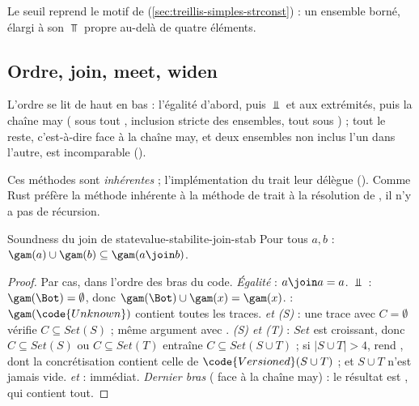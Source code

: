 Le seuil reprend le motif de  (\cref{sec:treillis-simples-strconst}) :
un ensemble borné, élargi à son $\Top$ propre au-delà de quatre éléments.

\subsection{Ordre, join, meet, widen}


L'ordre se lit de haut en bas : l'égalité d'abord, puis $\Bot$ et
 aux extrémités, puis la chaîne may ( sous tout
, inclusion stricte des ensembles, tout  sous
) ; tout le reste, c'est-à-dire  face à
la chaîne may, et deux ensembles non inclus l'un dans l'autre, est
incomparable ().


Ces méthodes sont \emph{inhérentes} ; l'implémentation du trait
 leur délègue
(). Comme Rust préfère la méthode inhérente à la méthode de trait
à la résolution de , il n'y a pas de récursion.

\begin{theoreme}{Soundness du join de }{statevalue-stabilite-join-stab}
  Pour tous $a, b$ : $\gam(a) \cup \gam(b) \subseteq \gam(a \join b)$.
\end{theoreme}
\begin{proof}
  Par cas, dans l'ordre des bras du code.
  \emph{Égalité} : $a \join a = a$. \emph{$\Bot$} : $\gam(\Bot) =
  \emptyset$, donc $\gam(\Bot) \cup \gam(x) = \gam(x)$.
  \emph{} : $\gam(\code{Unknown})$ contient toutes les traces.
  \emph{ et (S)} : une trace avec $C =
  \emptyset$ vérifie $C \subseteq \mathit{Set}(S)$ ; même argument avec
  . \emph{(S) et (T)} :
  $\mathit{Set}$ est croissant, donc $C \subseteq \mathit{Set}(S)$ ou $C
  \subseteq \mathit{Set}(T)$ entraîne $C \subseteq \mathit{Set}(S \cup T)$ ;
  si $|S \cup T| > 4$,  rend , dont la
  concrétisation contient celle de $\code{Versioned}(S \cup T)$ ; et
  $S \cup T$ n'est jamais vide. \emph{ et
  } : immédiat. \emph{Dernier bras} ( face à
  la chaîne may) : le résultat est , qui contient tout.
\end{proof}

